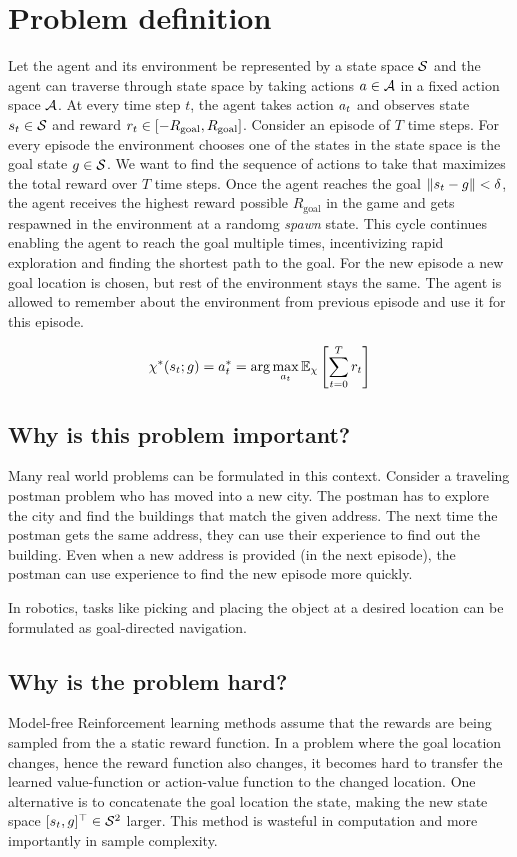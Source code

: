 \section{Problem definition}
\newcommand{\Rgoal}{R_{\text{goal}}}
Let the agent and its environment be represented by a state space $\mathcal{S}$ and the
agent can traverse through state space by taking actions $a \in \mathcal{A}$ in a
fixed action space $\mathcal{A}$. At every time step $t$, the agent takes action $a_t$
and observes state $s_t \in \mathcal{S}$ and reward
$\rew_t \in [-\Rgoal, \Rgoal]$.
Consider an episode of $T$ time steps.
For every episode the environment chooses one of the states in the state space is
the goal state $g \in \mathcal{S}$.
We want to find the sequence of actions to take that
maximizes the total reward over $T$ time steps.
Once the agent reaches the goal $\|s_t - g\| < \delta$, the agent receives the highest reward possible $\Rgoal$ in the game and gets respawned in the environment at a randomg \emph{spawn} state.
This cycle continues enabling the agent to reach the goal multiple times,
incentivizing rapid exploration and finding the shortest path to the goal.
For the new episode a new goal location is chosen, but rest of the environment stays the same.
The agent is allowed to remember about the environment from previous episode and use
it for this episode.

%
\begin{align}
\chi^*(s_t ; g) = a^*_t = \arg \max_{a_t} \mathbb{E}_{\chi}\left[ \sum_{t=0}^T r_t \right]
\end{align}%
%

\subsection{Why is this problem important?}
Many real world problems can be formulated in this context.
Consider a traveling postman problem who has moved into a new city. The postman has
to explore the city and find the buildings that match the given address.
The next time the postman gets the same address, they can use their experience to find out the building.
Even when a new address is provided (in the next episode), the postman can use
experience to find the new episode more quickly.

In robotics, tasks like picking and placing the object at a desired location can be
formulated as goal-directed navigation.

\subsection{Why is the problem hard?}
Model-free Reinforcement learning methods assume that the rewards are being sampled
from the a static reward function.
In a problem where the goal location changes, hence the reward function also changes,
it becomes hard to transfer the learned value-function or action-value function to
the changed location.
One alternative is to concatenate the goal location the state, making the new state space
$[s_t, g]^\top \in \mathcal{S}^2$ larger.
This method is wasteful in computation and more importantly in sample complexity.

